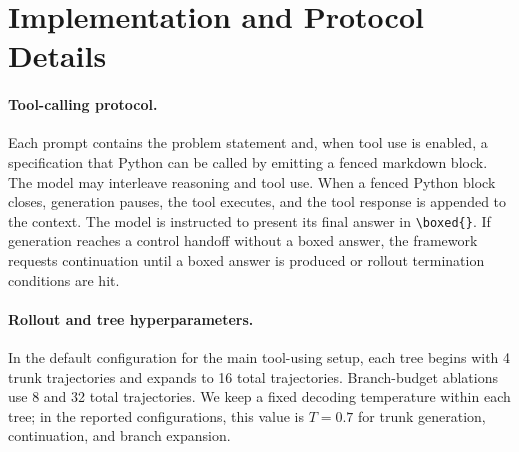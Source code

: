 \documentclass{article}
\begin{document}



\appendix
\section{Implementation and Protocol Details}
\label{app:implementation-protocol}

\paragraph{Tool-calling protocol.}
Each prompt contains the problem statement and, when tool use is enabled, a specification that Python can be called by emitting a fenced markdown block. The model may interleave reasoning and tool use. When a fenced Python block closes, generation pauses, the tool executes, and the tool response is appended to the context. The model is instructed to present its final answer in \texttt{\textbackslash boxed\{\}}. If generation reaches a control handoff without a boxed answer, the framework requests continuation until a boxed answer is produced or rollout termination conditions are hit.

\paragraph{Rollout and tree hyperparameters.}
In the default configuration for the main tool-using setup, each tree begins with 4 trunk trajectories and expands to 16 total trajectories. Branch-budget ablations use 8 and 32 total trajectories. We keep a fixed decoding temperature within each tree; in the reported configurations, this value is $T=0.7$ for trunk generation, continuation, and branch expansion.
\end{document}
